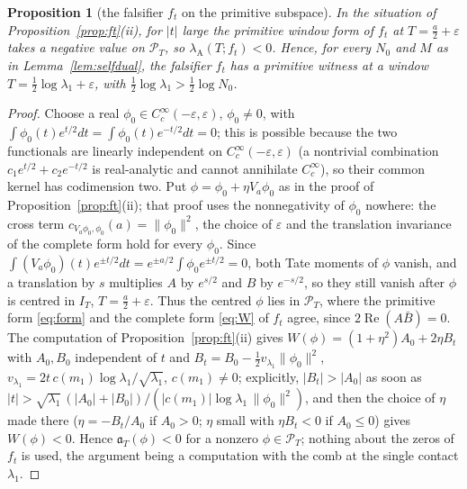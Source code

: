 \documentclass[11pt]{amsart}
\newtheorem{proposition}[theorem]{Proposition}
\theoremstyle{definition}
\theoremstyle{remark}
\newcommand{\Rel}{\operatorname{Re}}
\newcommand{\PT}{\mathcal P_T}
\newcommand{\IT}{I_T}
\begin{document}
\begin{proposition}[the falsifier $f_t$ on the primitive subspace]\label{prop:ftprim}
In the situation of Proposition~\ref{prop:ft}(ii), for $|t|$ large the primitive window form of $f_t$ at
$T=\frac a2+\varepsilon$ takes a negative value on $\PT$, so $\lambda_{\mathrm A}(T;f_t)<0$. Hence, for every
$N_0$ and $M$ as in Lemma~\ref{lem:selfdual}, the falsifier $f_t$ has a primitive witness at a window
$T=\frac12\log\lambda_1+\varepsilon$, with $\frac12\log\lambda_1>\frac12\log N_0$.
\end{proposition}
\begin{proof}
Choose a real $\phi_0\in C_c^\infty(-\varepsilon,\varepsilon)$, $\phi_0\ne0$, with
$\int\phi_0(t)e^{t/2}dt=\int\phi_0(t)e^{-t/2}dt=0$; this is possible because the two functionals are linearly
independent on $C_c^\infty(-\varepsilon,\varepsilon)$ (a nontrivial combination $c_1e^{t/2}+c_2e^{-t/2}$ is real-analytic
and cannot annihilate $C_c^\infty$), so their common kernel has codimension two. Put $\phi=\phi_0+\eta V_a\phi_0$
as in the proof of Proposition~\ref{prop:ft}(ii); that proof uses the nonnegativity of $\phi_0$ nowhere: the cross
term $c_{V_a\phi_0,\phi_0}(a)=\|\phi_0\|^2$, the choice of $\varepsilon$ and the translation invariance of the complete
form hold for every $\phi_0$. Since $\int(V_a\phi_0)(t)e^{\pm t/2}dt=e^{\pm a/2}\int\phi_0e^{\pm t/2}=0$, both Tate
moments of $\phi$ vanish, and a translation by $s$ multiplies $A$ by $e^{s/2}$ and $B$ by $e^{-s/2}$, so they
still vanish after $\phi$ is centred in $\IT$, $T=\frac a2+\varepsilon$. Thus the centred $\phi$ lies in $\PT$,
where the primitive form \eqref{eq:form} and the complete form \eqref{eq:W} of $f_t$ agree, since
$2\Rel(A\bar B)=0$. The computation of Proposition~\ref{prop:ft}(ii) gives $W(\phi)=(1+\eta^2)A_0+2\eta B_t$ with
$A_0,B_0$ independent of $t$ and $B_t=B_0-\frac12v_{\lambda_1}\|\phi_0\|^2$, $v_{\lambda_1}=2t\,c(m_1)\log\lambda_1/\sqrt{\lambda_1}$,
$c(m_1)\ne0$; explicitly, $|B_t|>|A_0|$ as soon as
$|t|>\sqrt{\lambda_1}\,(|A_0|+|B_0|)/(|c(m_1)|\log\lambda_1\,\|\phi_0\|^2)$, and then the choice of $\eta$ made there
($\eta=-B_t/A_0$ if $A_0>0$; $\eta$ small with $\eta B_t<0$ if $A_0\le0$) gives $W(\phi)<0$. Hence
$\mathfrak a_T(\phi)<0$ for a nonzero $\phi\in\PT$; nothing about the zeros of $f_t$ is used, the argument being a
computation with the comb at the single contact $\lambda_1$.
\end{proof}
\end{document}
